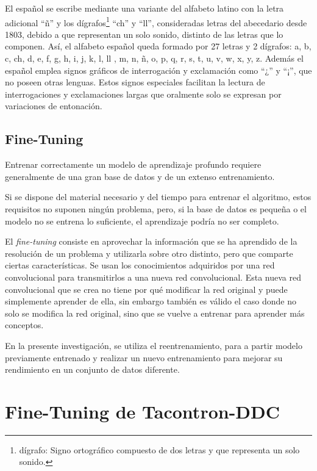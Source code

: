 El español se escribe mediante una variante del alfabeto latino con la letra adicional ``ñ'' y los dígrafos\footnote{dígrafo: Signo ortográfico compuesto de dos letras y que representa un solo sonido.} ``ch'' y ``ll'', consideradas letras del abecedario desde 1803, debido a que representan un solo sonido, distinto de las letras que lo componen. Así, el alfabeto español queda formado por 27 letras y 2 dígrafos: a, b, c, ch, d, e, f, g, h, i, j, k, l, ll , m, n, ñ, o, p, q, r, s, t, u, v, w, x, y, z. Además el español emplea signos gráficos de interrogación y exclamación como ``¿'' y ``¡'', que no poseen otras lenguas. Estos signos especiales facilitan la lectura de interrogaciones y exclamaciones largas que oralmente solo se expresan por variaciones de entonación. 

\subsection*{Fine-Tuning}
Entrenar correctamente un modelo de aprendizaje profundo requiere generalmente de una gran base de datos y de un extenso entrenamiento.

Si se dispone del material necesario y del tiempo para entrenar el algoritmo, estos requisitos no suponen ningún problema, pero, si la base de datos es pequeña o el modelo no se entrena lo suficiente, el aprendizaje podría no ser completo.

El \textit{fine-tuning} consiste en aprovechar la información que se ha aprendido de la resolución de un problema y utilizarla sobre otro distinto, pero que comparte ciertas características. Se usan los conocimientos adquiridos por una red convolucional para transmitirlos a una nueva red convolucional. Esta nueva red convolucional que se crea no tiene por qué modificar la red original y puede simplemente aprender de ella, sin embargo también es válido el caso donde no solo se modifica la red original, sino que se vuelve a entrenar para aprender más conceptos.

En la presente investigación, se utiliza el reentrenamiento, para a partir modelo previamente entrenado y realizar un nuevo entrenamiento para mejorar su rendimiento en un conjunto de datos diferente.\\

\section{Fine-Tuning de Tacontron-DDC} \label{taco}

